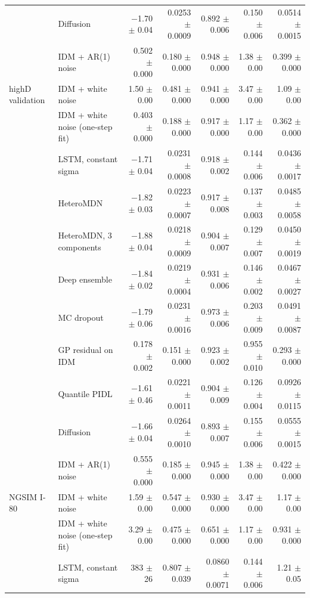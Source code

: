 \begin{longtable}{llrrrrr}
 & Diffusion & $-$1.70 $\pm$ 0.04 & 0.0253 $\pm$ 0.0009 & 0.892 $\pm$ 0.006 & 0.150 $\pm$ 0.006 & 0.0514 $\pm$ 0.0015 \\
 & IDM + AR(1) noise & 0.502 $\pm$ 0.000 & 0.180 $\pm$ 0.000 & 0.948 $\pm$ 0.000 & 1.38 $\pm$ 0.00 & 0.399 $\pm$ 0.000 \\
\midrule
highD validation & IDM + white noise & 1.50 $\pm$ 0.00 & 0.481 $\pm$ 0.000 & 0.941 $\pm$ 0.000 & 3.47 $\pm$ 0.00 & 1.09 $\pm$ 0.00 \\
 & IDM + white noise (one-step fit) & 0.403 $\pm$ 0.000 & 0.188 $\pm$ 0.000 & 0.917 $\pm$ 0.000 & 1.17 $\pm$ 0.00 & 0.362 $\pm$ 0.000 \\
 & LSTM, constant sigma & $-$1.71 $\pm$ 0.04 & 0.0231 $\pm$ 0.0008 & 0.918 $\pm$ 0.002 & 0.144 $\pm$ 0.006 & 0.0436 $\pm$ 0.0017 \\
 & HeteroMDN & $-$1.82 $\pm$ 0.03 & 0.0223 $\pm$ 0.0007 & 0.917 $\pm$ 0.008 & 0.137 $\pm$ 0.003 & 0.0485 $\pm$ 0.0058 \\
 & HeteroMDN, 3 components & $-$1.88 $\pm$ 0.04 & 0.0218 $\pm$ 0.0009 & 0.904 $\pm$ 0.007 & 0.129 $\pm$ 0.007 & 0.0450 $\pm$ 0.0019 \\
 & Deep ensemble & $-$1.84 $\pm$ 0.02 & 0.0219 $\pm$ 0.0004 & 0.931 $\pm$ 0.006 & 0.146 $\pm$ 0.002 & 0.0467 $\pm$ 0.0027 \\
 & MC dropout & $-$1.79 $\pm$ 0.06 & 0.0231 $\pm$ 0.0016 & 0.973 $\pm$ 0.006 & 0.203 $\pm$ 0.009 & 0.0491 $\pm$ 0.0087 \\
 & GP residual on IDM & 0.178 $\pm$ 0.002 & 0.151 $\pm$ 0.000 & 0.923 $\pm$ 0.002 & 0.955 $\pm$ 0.010 & 0.293 $\pm$ 0.000 \\
 & Quantile PIDL & $-$1.61 $\pm$ 0.46 & 0.0221 $\pm$ 0.0011 & 0.904 $\pm$ 0.009 & 0.126 $\pm$ 0.004 & 0.0926 $\pm$ 0.0115 \\
 & Diffusion & $-$1.66 $\pm$ 0.04 & 0.0264 $\pm$ 0.0010 & 0.893 $\pm$ 0.007 & 0.155 $\pm$ 0.006 & 0.0555 $\pm$ 0.0015 \\
 & IDM + AR(1) noise & 0.555 $\pm$ 0.000 & 0.185 $\pm$ 0.000 & 0.945 $\pm$ 0.000 & 1.38 $\pm$ 0.00 & 0.422 $\pm$ 0.000 \\
\midrule
NGSIM I-80 & IDM + white noise & 1.59 $\pm$ 0.00 & 0.547 $\pm$ 0.000 & 0.930 $\pm$ 0.000 & 3.47 $\pm$ 0.00 & 1.17 $\pm$ 0.00 \\
 & IDM + white noise (one-step fit) & 3.29 $\pm$ 0.00 & 0.475 $\pm$ 0.000 & 0.651 $\pm$ 0.000 & 1.17 $\pm$ 0.00 & 0.931 $\pm$ 0.000 \\
 & LSTM, constant sigma & 383 $\pm$ 26 & 0.807 $\pm$ 0.039 & 0.0860 $\pm$ 0.0071 & 0.144 $\pm$ 0.006 & 1.21 $\pm$ 0.05 \\

\end{longtable}
